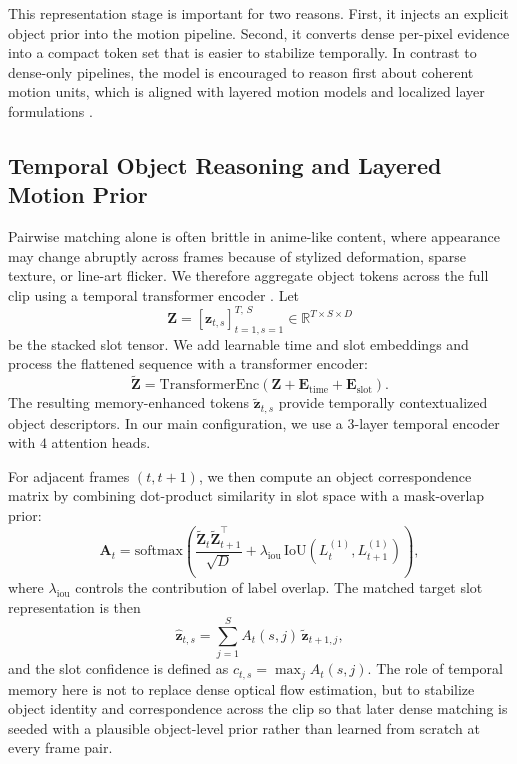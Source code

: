 This representation stage is important for two reasons. First, it injects an explicit object prior into the motion pipeline. Second, it converts dense per-pixel evidence into a compact token set that is easier to stabilize temporally. In contrast to dense-only pipelines, the model is encouraged to reason first about coherent motion units, which is aligned with layered motion models and localized layer formulations \cite{wang1994representing,sevillalara2016optical}.

\subsection{Temporal Object Reasoning and Layered Motion Prior}

Pairwise matching alone is often brittle in anime-like content, where appearance may change abruptly across frames because of stylized deformation, sparse texture, or line-art flicker. We therefore aggregate object tokens across the full clip using a temporal transformer encoder \cite{vaswani2017attention}. Let
\begin{equation}
\mathbf{Z} = [\mathbf{z}_{t,s}]_{t=1,s=1}^{T,\,S} \in \mathbb{R}^{T\times S\times D}
\end{equation}
be the stacked slot tensor. We add learnable time and slot embeddings and process the flattened sequence with a transformer encoder:
\begin{equation}
\widetilde{\mathbf{Z}} = \mathrm{TransformerEnc}(\mathbf{Z} + \mathbf{E}_{\mathrm{time}} + \mathbf{E}_{\mathrm{slot}}).
\end{equation}
The resulting memory-enhanced tokens $\tilde{\mathbf{z}}_{t,s}$ provide temporally contextualized object descriptors. In our main configuration, we use a $3$-layer temporal encoder with $4$ attention heads.

For adjacent frames $(t,t+1)$, we then compute an object correspondence matrix by combining dot-product similarity in slot space with a mask-overlap prior:
\begin{equation}
\label{eq:slot_matching}
\mathbf{A}_t = \mathrm{softmax}\left(\frac{\widetilde{\mathbf{Z}}_t\widetilde{\mathbf{Z}}_{t+1}^{\top}}{\sqrt{D}} + \lambda_{\mathrm{iou}}\,\mathrm{IoU}(L_t^{(1)},L_{t+1}^{(1)})\right),
\end{equation}
where $\lambda_{\mathrm{iou}}$ controls the contribution of label overlap. The matched target slot representation is then
\begin{equation}
\hat{\mathbf{z}}_{t,s} = \sum_{j=1}^{S} A_t(s,j)\,\tilde{\mathbf{z}}_{t+1,j},
\end{equation}
and the slot confidence is defined as $c_{t,s}=\max_j A_t(s,j)$. The role of temporal memory here is not to replace dense optical flow estimation, but to stabilize object identity and correspondence across the clip so that later dense matching is seeded with a plausible object-level prior rather than learned from scratch at every frame pair.

